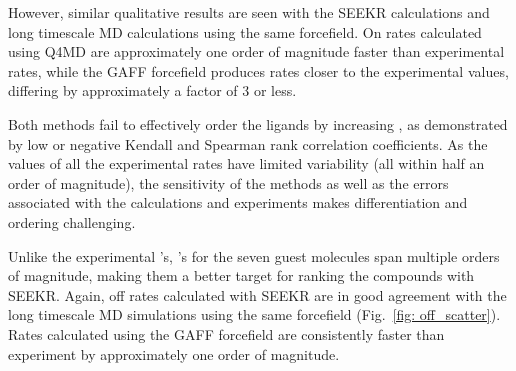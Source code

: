 However, similar qualitative results are seen with the SEEKR calculations and
long timescale MD calculations using the same forcefield.
On rates calculated using Q4MD are approximately one order of magnitude faster
than experimental rates, while the GAFF forcefield produces rates closer to the
experimental values, differing by approximately a factor of 3 or less.

\par Both methods fail to effectively order the ligands by increasing \kon,
as demonstrated by low or negative Kendall and Spearman rank correlation coefficients.
As the values of all the experimental rates have limited variability (all within
half an order of magnitude), the sensitivity of the methods as well as the errors
associated with the calculations and experiments makes differentiation and
ordering challenging.


\par Unlike the experimental \kon's, \koff's for the seven guest
molecules span multiple orders of magnitude, making them a better target for
ranking the compounds with SEEKR.
Again, off rates calculated with SEEKR are in good agreement with the long
timescale MD simulations using the same forcefield (Fig.~\ref{fig: off_scatter}). Rates calculated using the
GAFF forcefield are consistently faster than experiment by approximately one
order of magnitude.

